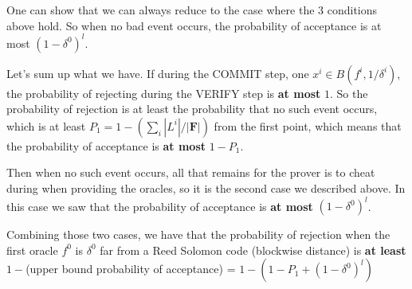 \documentclass[12pt]{extarticle}
\newcommand{\<}{\langle}
\renewcommand{\>}{\rangle}
\theoremstyle{definition}
\begin{document}
One can show that we can always reduce to the case where the $3$ conditions above hold. So when no bad event occurs, the probability of acceptance is at most $(1-\delta^0)^l$.

Let's sum up what we have. If during the COMMIT step, one $x^i\in B(f^i,1/\delta^i)$, the probability of rejecting during the VERIFY step is \textbf{at most} $1$. So the probability of rejection is at least the probability that no such event occurs, which is at least $P_1=1-(\sum_i|L^i|/|\mathbf{F}|)$ from the first point, which means that the probability of acceptance is \textbf{at most} $1-P_1$.

Then when no such event occurs, all that remains for the prover is to cheat during when providing the oracles, so it is the second case we described above. In this case we saw that the probability of acceptance is \textbf{at most} $(1-\delta^0)^l$.

Combining those two cases, we have that the probability of rejection when the first oracle $f^0$ is $\delta^0$ far from a Reed Solomon code (blockwise distance) is \textbf{at least} $1-$(upper bound probability of acceptance) = $1-(1-P_1 + (1-\delta^0)^l)$
\end{document}

